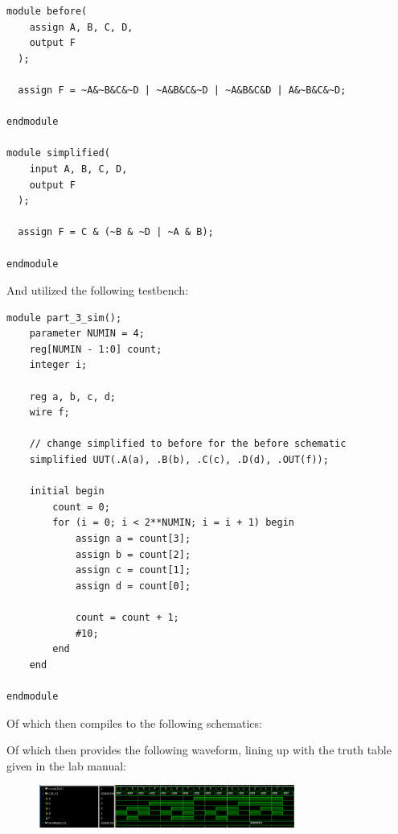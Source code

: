 \begin{lstlisting}[caption={Part 3 Verilog Code}, label={Part 3 Verilog}, style=Verilog]
module before(
    assign A, B, C, D,
    output F
  );

  assign F = ~A&~B&C&~D | ~A&B&C&~D | ~A&B&C&D | A&~B&C&~D;

endmodule

module simplified(
    input A, B, C, D,
    output F
  );
 
  assign F = C & (~B & ~D | ~A & B);

endmodule
\end{lstlisting}\newpage
And utilized the following testbench:
\begin{lstlisting}[caption={Part 3 Testbench}, label={Part 3 Testbench}, style=Verilog]
module part_3_sim();
    parameter NUMIN = 4;
    reg[NUMIN - 1:0] count;
    integer i;
    
    reg a, b, c, d;
    wire f;

    // change simplified to before for the before schematic
    simplified UUT(.A(a), .B(b), .C(c), .D(d), .OUT(f)); 
    
    initial begin
        count = 0;
        for (i = 0; i < 2**NUMIN; i = i + 1) begin
            assign a = count[3];
            assign b = count[2];
            assign c = count[1];
            assign d = count[0];
            
            count = count + 1;
            #10;
        end
    end
    
endmodule
\end{lstlisting}
Of which then compiles to the following schematics:
\begin{figure}[!htbp]
    \centering
    \qquad
\end{figure}
Of which then provides the following waveform, lining up with the truth table given in the lab manual:
\begin{figure}[!htbp]
    \centering
    \includegraphics[width=0.75\textwidth]{part-3-waveform.png}
    \label{Part 2 Waveform}
\end{figure}

